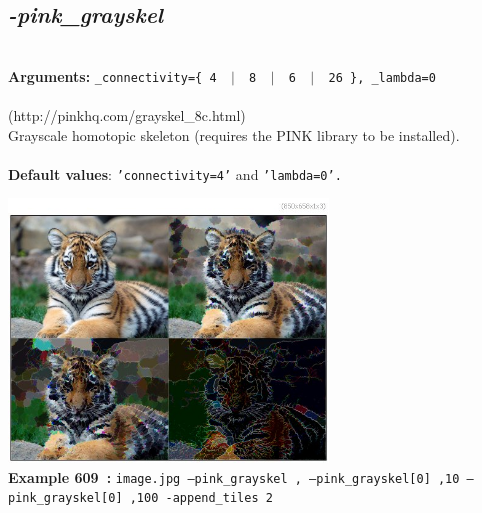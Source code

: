 \documentclass[a4paper,11pt,twoside]{book}
\begin{document}
\subsection{\emph{-pink\_grayskel} }\vspace*{-0.5em}
~\\\textbf{Arguments: } 
{\small \texttt{\_connectivity=\{ 4 ~$|$~ 8 ~$|$~ 6 ~$|$~ 26 \}, \_lambda=0}}\\~\\
(http://pinkhq.com/grayskel\_8c.html)
~\\Grayscale homotopic skeleton (requires the PINK library to be installed).
~\\~\\\textbf{Default values}: {\small \texttt{'connectivity=4'} and \texttt{'lambda=0'.}}
\begin{center}\includegraphics[keepaspectratio=true,height=7cm,width=\textwidth]{img/gmic_def609.jpg}\\
{\footnotesize \textbf{Example 609~:} \texttt{image.jpg --pink\_grayskel , --pink\_grayskel[0] ,10 --pink\_grayskel[0] ,100 -append\_tiles 2}}
\end{center}
\end{document}
